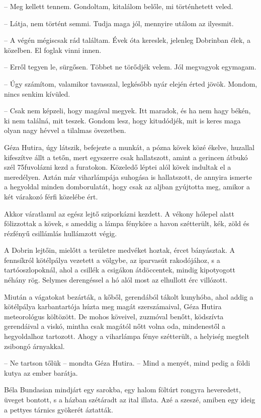 \documentclass{IEEEtran}
\begin{document}
– Meg kellett tennem. Gondoltam, kitalálom belőle, mi történhetett veled.

– Látja, nem történt semmi. Tudja maga jól, mennyire utálom az ilyesmit.

– A végén mégiscsak rád találtam. Évek óta kereslek, jelenleg Dobrinban élek,
a közelben. El foglak vinni innen.

– Erről tegyen le, sürgősen. Többet ne törődjék velem. Jól megvagyok egymagam.

– Úgy számítom, valamikor tavasszal, legkésőbb nyár elején érted jövök.
Mondom, nincs senkim kívüled.

– Csak nem képzeli, hogy magával megyek. Itt maradok, és ha nem hagy békén, ki
nem találná, mit teszek. Gondom lesz, hogy kitudódjék, mit is keres maga olyan
nagy hévvel a tilalmas övezetben.

Géza Hutira, úgy látszik, befejezte a munkát, a pózna kövek közé ékelve,
huzallal kifeszítve állt a tetőn, mert egyszerre csak hallatszott, amint a
gerincen átbukó szél 75fuvolázni kezd a furatokon. Közeledő léptei alól kövek
indultak el a meredélyen. Aztán már viharlámpája suhogása is hallatszott, de
annyira ismerte a hegyoldal minden domborulatát, hogy csak az aljban gyújtotta
meg, amikor a két várakozó férfi közelébe ért.

Akkor váratlanul az egész lejtő sziporkázni kezdett. A vékony hólepel alatt
fölizzottak a kövek, s ameddig a lámpa fényköre a havon szétterült, kék, zöld
és rézfényű csillámlás hullámzott végig.

A Dobrin lejtőin, mielőtt a területre medvéket hoztak, ércet bányásztak. A
fennsíkról kötélpálya vezetett a völgybe, az iparvasút rakodójához, s a
tartóoszlopoknál, ahol a csillék a csigákon átdöccentek, mindig kipotyogott
néhány rög. Selymes derengéssel a hó alól most az elhullott érc villózott.

Miután a vágatokat bezárták, a kőből, gerendából tákolt kunyhóba, ahol addig a
kötélpálya karbantartója húzta meg magát szerszámaival, Géza Hutira
meteorológus költözött. De mohos köveivel, zuzmóval benőtt, ködszívta
gerendáival a viskó, mintha csak magától nőtt volna oda, mindenestől a
hegyoldalhoz tartozott. Ahogy a viharlámpa fénye szétterült, a helyiség
megtelt zsibongó árnyakkal.

– Ne tartson tőlük – mondta Géza Hutira. – Mind a menyét, mind pedig a földi
kutya az ember barátja.

Béla Bundasian mindjárt egy sarokba, egy halom föltúrt rongyra heveredett,
üveget bontott, s a házban szétáradt az ital illata. Azé a szeszé, amiben egy
ideig a pettyes tárnics gyökerét áztatták.
\end{document}
